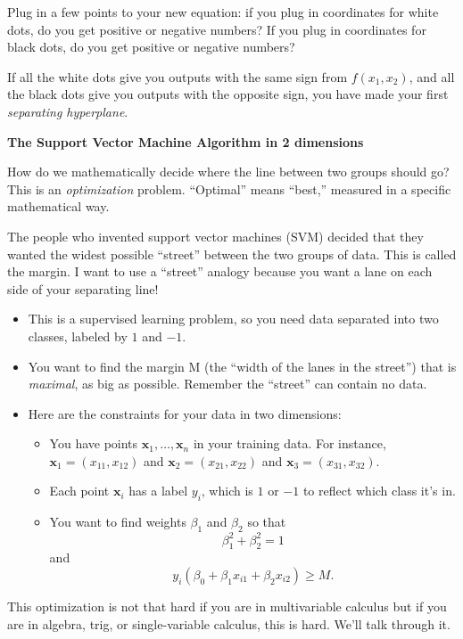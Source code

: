 \documentclass[10pt]{article}
\renewcommand{\vec}[1]{\mathbf{#1}}
\begin{document}
Plug in a few points to your new equation: if you plug in coordinates for white dots, do you get positive or negative numbers? If you plug in coordinates for black dots, do you get positive or negative numbers?
\vfill

If all the white dots give you outputs with the same sign from $f(x_1,x_2)$, and all the black dots give you outputs with the opposite sign, you have made your first \textit{separating hyperplane}.
\pagebreak

\begin{center}
\bf{The Support Vector Machine Algorithm in 2 dimensions}
\end{center}


How do we mathematically decide where the line between two groups should go? This is an \textit{optimization} problem. ``Optimal'' means ``best,'' measured in a specific mathematical way.

The people who invented support vector machines (SVM) decided that they wanted the widest possible ``street'' between the two groups of data. This is called the margin. I want to use a ``street'' analogy because you want a lane on each side of your separating line!

\begin{itemize}
\item This is a supervised learning problem, so you need data separated into two classes, labeled by $1$ and $-1$.
\item  You want to find the margin M (the ``width of the lanes in the street'') that is \textit{maximal}, as big as possible. Remember the ``street'' can contain no data. 
\item Here are the constraints for your data in two dimensions:
\begin{itemize}
\item You have points $\vec{x}_1, \ldots, \vec{x}_n$ in your training data. For instance, $\vec{x}_1 = (x_{11}, x_{12})$ and $\vec{x}_2 = (x_{21}, x_{22})$ and $\vec{x}_3 = (x_{31}, x_{32})$. 
\item Each point $\vec{x}_i$ has a label $y_i$, which is $1$ or $-1$ to reflect which class it's in.
\item You want to find weights $\beta_1$ and $\beta_2$ so that \[\beta_1^2 +\beta_2^2=1\] and \[y_i (\beta_0 + \beta_1 x_{i1} + \beta_2 x_{i2}) \geq M.\]
\end{itemize}
\end{itemize}

This optimization is not that hard if you are in multivariable calculus \smiley{} but if you are in algebra, trig, or single-variable calculus, this is hard. We'll talk through it.
\end{document}
